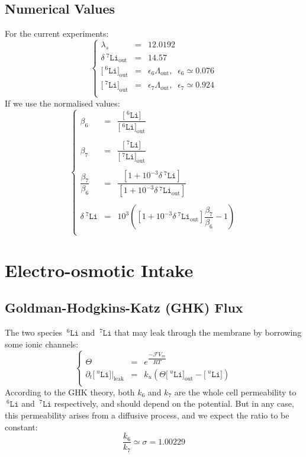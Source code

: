 \documentclass[aps,onecolumn,11pt]{revtex4}
\newcommand{\mychem}[1]{\mathtt{#1}}
\newcommand{\myconc}[1]{\big[#1\big]}
\newcommand{\Faraday}{\mathcal{F}}
\newcommand{\spLi}[1]{{\!~^{#1}\mychem{Li}}}
\newcommand{\Li}[1]{\myconc{\spLi{#1}}}
\newcommand{\deltaLi}{\delta\!\!\spLi{7}}
\newcommand{\myleak}[1]{\left.{#1}\right\vert_{\mathrm{leak}}}
\newcommand{\myout}[1]{{#1}_{\mathrm{out}}}
\newcommand{\LiOut}[1]{\myout{\Li{#1}}}
\newcommand{\LiAll}{\Lambda}
\newcommand{\LiAllOut}{\myout{\LiAll}}
\newcommand{\deltaLiOut}{\myout{\deltaLi}}
\begin{document}
\subsection{Numerical Values}
For the current experiments:
\begin{equation}
\left\lbrace
\begin{array}{rcl}
	\lambda_s   & = & 12.0192\\
	\deltaLiOut & = & 14.57\\
	\LiOut{6}   & = & \epsilon_6 \LiAllOut, \;\;\epsilon_6\simeq 0.076\\
	\LiOut{7}   & = & \epsilon_7 \LiAllOut, \;\;\epsilon_7\simeq 0.924\\
\end{array}
\right. 
\end{equation}
If we use the normalised values:
\begin{equation}
\left\lbrace
\begin{array}{rcl}
	\beta_6 & = & \dfrac{\Li{6}}{\LiOut{6}}\\
	\\
	\beta_7 & = & \dfrac{\Li{7}}{\LiOut{7}}\\
	\\
	\dfrac{\beta_7}{\beta_6} & = & \dfrac{\left[1+10^{-3}\deltaLi\right]}{\left[1+10^{-3}\deltaLiOut\right]}\\
	\\
	\deltaLi & = & 10^3 \left( \left[1+10^{-3}\deltaLiOut\right]\dfrac{\beta_7}{\beta_6} -1 \right)\\
\end{array}
\right.
\end{equation}


\section{Electro-osmotic Intake}
\subsection{Goldman-Hodgkins-Katz (GHK) Flux}
The two species $\spLi{6}$ and $\spLi{7}$ that may leak through the membrane by borrowing some ionic channels:
\begin{equation}
\left\lbrace
\begin{array}{rcl}
	\Theta    & = & e^{\dfrac{-\Faraday V_m }{RT}} \\
	\partial_t \myleak{\Li{u}} & = & k_u \left( \Theta \LiOut{u} - \Li{u}\right)\\
\end{array}
\right.
\end{equation}
According to the GHK theory, both $k_6$ and $k_7$ are the whole cell permeability to $\spLi{6}$ and $\spLi{7}$ respectively,
and should depend on the potential. But in any case, this permeability arises from a diffusive process, and we expect the ratio to be constant:
\begin{equation}
	\dfrac{k_6}{k_7} \simeq \sigma = 1.00229
\end{equation}
\end{document}
